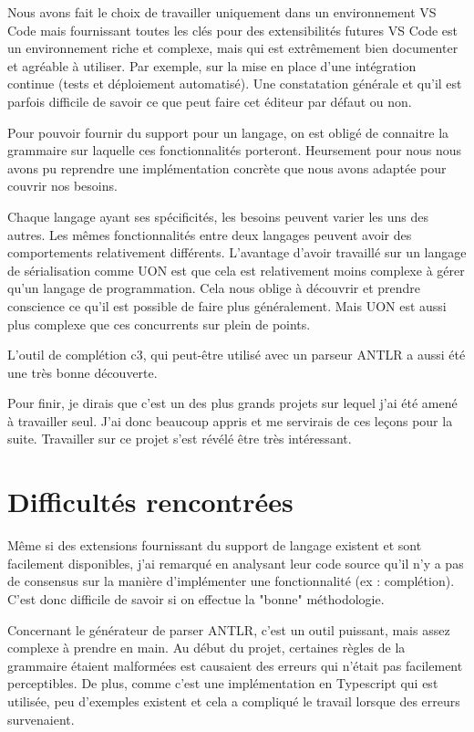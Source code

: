\documentclass[
    iict, %
    il, %
]{heig-tb}
\begin{document}
Nous avons fait le choix de travailler uniquement dans un environnement VS Code mais fournissant toutes les clés pour des extensibilités futures
VS Code est un environnement riche et complexe, mais qui est extrêmement bien documenter et agréable à utiliser.
Par exemple, sur la mise en place d'une intégration continue (tests et déploiement automatisé).
Une constatation générale et qu'il est parfois difficile de savoir ce que peut faire cet éditeur par défaut ou non.

Pour pouvoir fournir du support pour un langage, on est obligé de connaitre la grammaire sur laquelle ces fonctionnalités porteront.
Heursement pour nous nous avons pu reprendre une implémentation concrète que nous avons adaptée pour couvrir nos besoins.

Chaque langage ayant ses spécificités, les besoins peuvent varier les uns des autres.
Les mêmes fonctionnalités entre deux langages peuvent avoir des comportements relativement différents.
L'avantage d'avoir travaillé sur un langage de sérialisation comme UON est que cela est relativement moins complexe à gérer qu'un langage de programmation.
Cela nous oblige à découvrir et prendre conscience ce qu'il est possible de faire plus généralement.
Mais UON est aussi plus complexe que ces concurrents sur plein de points.

L'outil de complétion c3, qui peut-être utilisé avec un parseur ANTLR a aussi été une très bonne découverte.

Pour finir, je dirais que c'est un des plus grands projets sur lequel j'ai été amené à travailler seul.
J'ai donc beaucoup appris et me servirais de ces leçons pour la suite. Travailler sur ce projet s'est révélé être très intéressant.

\section{Difficultés rencontrées}

Même si des extensions fournissant du support de langage existent et sont facilement disponibles, j'ai remarqué en analysant leur code source qu'il n'y a pas de consensus sur la manière d'implémenter une fonctionnalité (ex : complétion).
C'est donc difficile de savoir si on effectue la "bonne" méthodologie.

Concernant le générateur de parser ANTLR, c'est un outil puissant, mais assez complexe à prendre en main.
Au début du projet, certaines règles de la grammaire étaient malformées est causaient des erreurs qui n'était pas facilement perceptibles.
De plus, comme c'est une implémentation en Typescript qui est utilisée, peu d'exemples existent et cela a compliqué le travail lorsque des erreurs survenaient.
\end{document}
